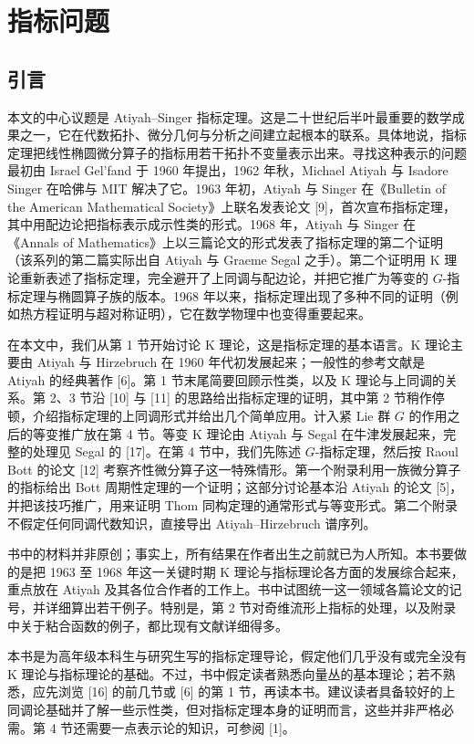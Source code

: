 \section{指标问题}

\subsection{引言}

本文的中心议题是 Atiyah--Singer 指标定理。这是二十世纪后半叶最重要的数学成果之一，它在代数拓扑、微分几何与分析之间建立起根本的联系。具体地说，指标定理把线性椭圆微分算子的指标用若干拓扑不变量表示出来。寻找这种表示的问题最初由 Israel Gel'fand 于 1960 年提出，1962 年秋，Michael Atiyah 与 Isadore Singer 在哈佛与 MIT 解决了它。1963 年初，Atiyah 与 Singer 在《Bulletin of the American Mathematical Society》上联名发表论文 [9]，首次宣布指标定理，其中用配边论把指标表示成示性类的形式。1968 年，Atiyah 与 Singer 在《Annals of Mathematics》上以三篇论文的形式发表了指标定理的第二个证明（该系列的第二篇实际出自 Atiyah 与 Graeme Segal 之手）。第二个证明用 K 理论重新表述了指标定理，完全避开了上同调与配边论，并把它推广为等变的 $G$-指标定理与椭圆算子族的版本。1968 年以来，指标定理出现了多种不同的证明（例如热方程证明与超对称证明），它在数学物理中也变得重要起来。

在本文中，我们从第 1 节开始讨论 K 理论，这是指标定理的基本语言。K 理论主要由 Atiyah 与 Hirzebruch 在 1960 年代初发展起来；一般性的参考文献是 Atiyah 的经典著作 [6]。第 1 节末尾简要回顾示性类，以及 K 理论与上同调的关系。第 2、3 节沿 [10] 与 [11] 的思路给出指标定理的证明，其中第 2 节稍作停顿，介绍指标定理的上同调形式并给出几个简单应用。计入紧 Lie 群 $G$ 的作用之后的等变推广放在第 4 节。等变 K 理论由 Atiyah 与 Segal 在牛津发展起来，完整的处理见 Segal 的 [17]。在第 4 节中，我们先陈述 $G$-指标定理，然后按 Raoul Bott 的论文 [12] 考察齐性微分算子这一特殊情形。第一个附录利用一族微分算子的指标给出 Bott 周期性定理的一个证明；这部分讨论基本沿 Atiyah 的论文 [5]，并把该技巧推广，用来证明 Thom 同构定理的通常形式与等变形式。第二个附录不假定任何同调代数知识，直接导出 Atiyah--Hirzebruch 谱序列。

书中的材料并非原创；事实上，所有结果在作者出生之前就已为人所知。本书要做的是把 1963 至 1968 年这一关键时期 K 理论与指标理论各方面的发展综合起来，重点放在 Atiyah 及其各位合作者的工作上。书中试图统一这一领域各篇论文的记号，并详细算出若干例子。特别是，第 2 节对奇维流形上指标的处理，以及附录中关于粘合函数的例子，都比现有文献详细得多。

本书是为高年级本科生与研究生写的指标定理导论，假定他们几乎没有或完全没有 K 理论与指标理论的基础。不过，书中假定读者熟悉向量丛的基本理论；若不熟悉，应先浏览 [16] 的前几节或 [6] 的第 1 节，再读本书。建议读者具备较好的上同调论基础并了解一些示性类，但对指标定理本身的证明而言，这些并非严格必需。第 4 节还需要一点表示论的知识，可参阅 [1]。

